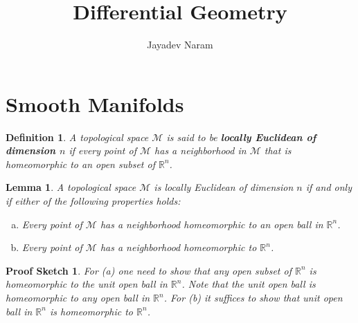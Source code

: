 \documentclass[11pt,a4paper]{article}
\author{Jayadev Naram}
\title{Differential Geometry}
\begin{document}
\date{}
\maketitle
\tableofcontents

\newpage

\newtheorem{theorem}{Theorem}
\newtheorem{corollary}{Corollary}[theorem]
\newtheorem{lemma}[theorem]{Lemma}
\newtheorem{definition}{Definition}
\newtheorem{remark}{Remark}
\newtheorem*{sketch}{Proof Sketch}
\newtheorem*{example}{Example}
\newtheorem{note}{Note}
\newtheorem{prop}{Proposition}

\newcommand{\R}{\mathbb{R}}
\newcommand{\A}{\mathcal{A}}
\newcommand{\M}{\mathcal{M}}
\newcommand{\N}{\mathcal{N}}
\newcommand{\Cinf}{\mathcal{C}^\infty}
\newcommand{\highlight}[1]{\textsl{\textbf{#1}}}
\newcommand{\mapping}[3]{#1:#2\rightarrow #3}
\newcommand{\doubt}{\highlight{[??]}}
\newcommand{\bigvert}[2]{\left.#1\right|_{#2}}
\newcommand{\bsdnn}[1]{$\boldsymbol{#1}$}
\newcommand{\bsdn}[1]{\boldsymbol{#1}}

\section{Smooth Manifolds}

\begin{definition}
A topological space $\M$ is said to be \highlight{locally Euclidean of dimension $n$} if every point of $\M$ has a neighborhood in $\M$ that is homeomorphic to an open subset of $\R^n$.
\end{definition}

\begin{lemma}
A topological space $\M$ is locally Euclidean of dimension $n$ if and only if either of the following properties holds:
\begin{enumerate}[(a)]
    \item Every point of $\M$ has a neighborhood homeomorphic to an open ball in $\R^n$.
    \item Every point of $\M$ has a neighborhood homeomorphic to $\R^n$.
\end{enumerate}
\end{lemma}

\begin{sketch}
For (a) one need to show that any open subset of $\R^n$ is homeomorphic to the unit open ball in $\R^n$. Note that the unit open ball is homeomorphic to any open ball in $\R^n$. For (b) it suffices to show that unit open ball in $\R^n$ is homeomorphic to $\R^n$.
\end{sketch}
\end{document}
